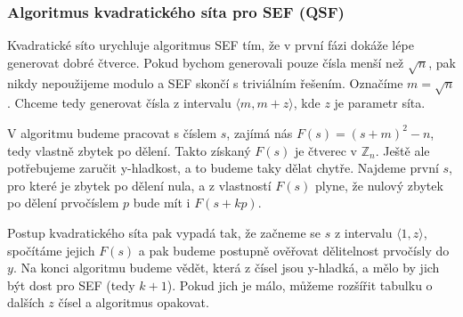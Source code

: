 \subsubsection{Algoritmus kvadratického síta pro SEF (QSF)}
Kvadratické síto urychluje algoritmus SEF tím, že v první fázi dokáže lépe
generovat dobré čtverce. Pokud bychom generovali pouze čísla menší než
$\sqrt{n}$, pak nikdy nepoužijeme modulo a SEF skončí s triviálním řešením.
Označíme $m = \sqrt{n}$. Chceme tedy generovat čísla z intervalu $\langle m, m +
z \rangle$, kde $z$ je parametr síta. 

V algoritmu budeme pracovat s číslem $s$, zajímá nás $F(s) = (s + m)^2 - n$,
tedy vlastně zbytek po dělení. Takto získaný $F(s)$ je čtverec v $\mathbb{Z}_n$.
Ještě ale potřebujeme zaručit y-hladkost, a to budeme taky dělat chytře. Najdeme
první $s$, pro které je zbytek po dělení nula, a z vlastností $F(s)$ plyne, že
nulový zbytek po dělení prvočíslem $p$ bude mít i $F(s + kp)$.

Postup kvadratického síta pak vypadá tak, že začneme se $s$ z intervalu $\langle
1, z\rangle$, spočítáme jejich $F(s)$ a pak budeme postupně ověřovat dělitelnost
prvočísly do $y$. Na konci algoritmu budeme vědět, která z čísel jsou y-hladká,
a mělo by jich být dost pro SEF (tedy $k+1$). Pokud jich je málo, můžeme
rozšířit tabulku o dalších $z$ čísel a algoritmus opakovat.


